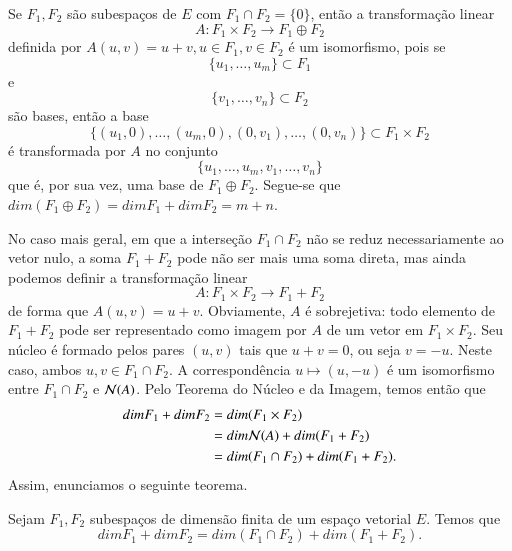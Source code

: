 Se $F_1,F_2$ são subespaços de $E$ com $F_1\cap F_2=\{ 0\}$, então a transformação linear
\begin{equation*}
  A:F_1\times F_2 \rightarrow F_1 \oplus F_2
\end{equation*}
definida por $A(u,v) = u+v, u\in F_1, v\in F_2$ é um isomorfismo, pois se 
\begin{equation*}
   \{u_1,\ldots,u_m\}\subset F_1
\end{equation*}
e 
\begin{equation*}
   \{v_1,\ldots,v_n\}\subset F_2
\end{equation*}
são bases, então a base 
\begin{equation*}
   \{(u_1,0),\ldots,(u_m,0),(0,v_1),\ldots,(0,v_n)\}\subset F_1\times F_2
\end{equation*}
é transformada por $A$ no conjunto 
\begin{equation*}
   \{u_1,\ldots,u_m,v_1,\ldots,v_n\}
\end{equation*}
que é, por sua vez, uma base de $F_1\oplus F_2$. Segue-se que $dim(F_1\oplus F_2)=dimF_1+dimF_2=m+n$.

No caso mais geral, em que a interseção $F_1\cap F_2$ não se reduz necessariamente ao vetor nulo, a soma $F_1+F_2$ pode não ser mais uma soma direta, mas ainda podemos definir a transformação linear
\begin{equation*}
  A:F_1\times F_2 \rightarrow F_1+F_2
\end{equation*}
de forma que $A(u,v)=u+v$. Obviamente, $A$ é sobrejetiva: todo elemento de $F_1+F_2$ pode ser representado como imagem por $A$ de um vetor em $F_1\times F_2$. Seu núcleo é formado pelos pares $(u,v)$ tais que $u+v=0$, ou seja $v=-u$. Neste caso, ambos $u,v\in F_1 \cap F_2$. A correspondência $u\mapsto (u,-u)$ é um isomorfismo entre $F_1\cap F_2$ e ${\cal{N}}(A)$. Pelo Teorema do Núcleo e da Imagem, temos então que
\begin{align*}
  dim F_1+dim F_2 &= dim(F_1\times F_2)\\
  &= dim {\cal{N}}(A)+dim(F_1+F_2)\\
  &= dim(F_1\cap F_2) + dim(F_1+F_2).
\end{align*}
Assim, enunciamos o seguinte teorema.
\begin{teo}
  Sejam $F_1, F_2$ subespaços de dimensão finita de um espaço vetorial $E$. Temos que
  \begin{equation*}
    dim F_1+dimF_2 = dim(F_1\cap F_2)+dim(F_1+F_2).
  \end{equation*}
\end{teo}

